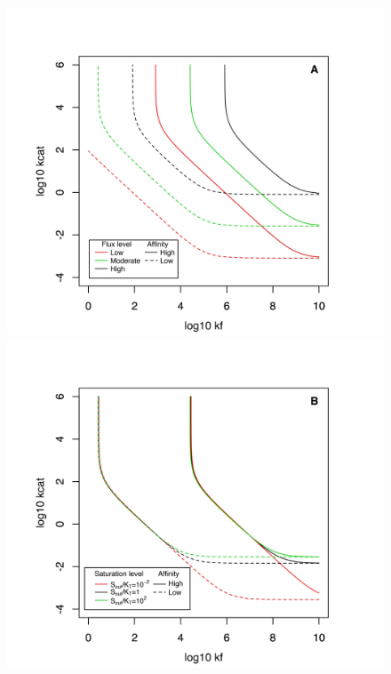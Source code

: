 \begin{figure}[h!]
\centering
\includegraphics[scale=0.55,trim=0.5cm -0.3cm 0cm 1.5cm,clip]{pics/Enzymes/2DFit_Flux_Sat.jpeg}
\includegraphics[scale=0.55,trim=0.5cm -0.3cm 0cm 1.5cm,clip]{pics/Enzymes/2DFit_NonSatToSat.jpeg}

\end{figure}
